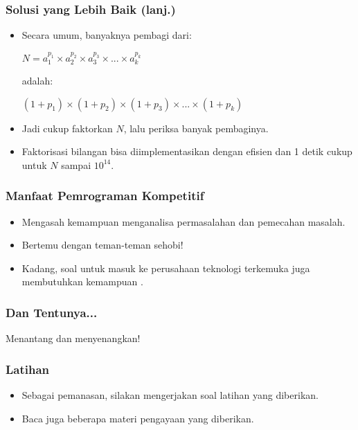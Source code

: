 \begin{frame}
\frametitle{Solusi yang Lebih Baik (lanj.)}
\begin{itemize}
  \item Secara umum, banyaknya pembagi dari:
  \newline
  \begin{center}
    $N = a_1^{p_1} \times a_2^{p_2} \times a_3^{p_3} \times ... \times a_k^{p_k}$
  \end{center}
  adalah:
  \newline
  \begin{center}
    $(1+p_1) \times (1+p_2) \times (1+p_3) \times ... \times (1+p_k)$
    \newline
  \end{center}
  \item Jadi cukup faktorkan $N$, lalu periksa banyak pembaginya.
  \item Faktorisasi bilangan bisa diimplementasikan dengan efisien dan 1 detik cukup untuk $N$ sampai $10^{14}$.
\end{itemize}
\end{frame}

\begin{frame}
\frametitle{Manfaat Pemrograman Kompetitif}
\begin{itemize}
  \item Mengasah kemampuan menganalisa permasalahan dan pemecahan masalah.
  \item Bertemu dengan teman-teman sehobi!
  \item Kadang, soal  untuk masuk ke perusahaan teknologi terkemuka juga membutuhkan kemampuan .
\end{itemize}
\end{frame}

\begin{frame}
\frametitle{Dan Tentunya...}
\begin{center}
  {\LARGE Menantang dan menyenangkan!}
\end{center}
\end{frame}

\begin{frame}
\frametitle{Latihan}
\begin{itemize}
  \item Sebagai pemanasan, silakan mengerjakan soal latihan yang diberikan.
  \item Baca juga beberapa materi pengayaan yang diberikan.
\end{itemize}
\end{frame}


